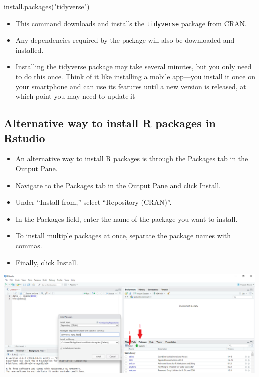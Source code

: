 \documentclass[
  letterpaper,
  DIV=11,
  numbers=noendperiod]{scrreprt}
\newenvironment{Shaded}{\begin{snugshade}}{\end{snugshade}}
\newcommand{\FunctionTok}[1]{\textcolor[rgb]{0.28,0.35,0.67}{#1}}
\newcommand{\NormalTok}[1]{\textcolor[rgb]{0.00,0.23,0.31}{#1}}
\newcommand{\StringTok}[1]{\textcolor[rgb]{0.13,0.47,0.30}{#1}}
\begin{document}
\begin{Shaded}
\begin{Highlighting}[]
\FunctionTok{install.packages}\NormalTok{(}\StringTok{"tidyverse"}\NormalTok{)}
\end{Highlighting}
\end{Shaded}

\begin{itemize}
\item
  This command downloads and installs the \texttt{tidyverse} package
  from CRAN.
\item
  Any dependencies required by the package will also be downloaded and
  installed.
\item
  Installing the tidyverse package may take several minutes, but you
  only need to do this once. Think of it like installing a mobile
  app---you install it once on your smartphone and can use its features
  until a new version is released, at which point you may need to update
  it
\end{itemize}

\subsection{Alternative way to install R packages in
Rstudio}\label{alternative-way-to-install-r-packages-in-rstudio}

\begin{itemize}
\item
  An alternative way to install R packages is through the Packages tab
  in the Output Pane.
\item
  Navigate to the Packages tab in the Output Pane and click Install.
\item
  Under ``Install from,'' select ``Repository (CRAN)''.
\item
  In the Packages field, enter the name of the package you want to
  install.
\item
  To install multiple packages at once, separate the package names with
  commas.
\item
  Finally, click Install.
\end{itemize}

\begin{center}
\includegraphics[width=1\textwidth,height=\textheight]{fig/2_install_packages.png}
\end{center}
\end{document}
